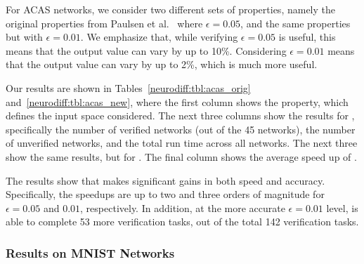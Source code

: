 For ACAS networks, we consider two different sets of properties,
namely the original properties from Paulsen et al.~\cite{PaulsenWW20}
where $ \epsilon = 0.05 $, and the same properties but with $ \epsilon
= 0.01 $.  We emphasize that, while verifying $ \epsilon = 0.05 $ is
useful, this means that the output value can vary by up to
10\%. Considering $ \epsilon = 0.01 $ means that the output value can
vary by up to 2\%, which is much more useful.

Our results are shown in Tables~\ref{neurodiff:tbl:acas_orig}
and~\ref{neurodiff:tbl:acas_new}, where the first column shows the property,
which defines the input space considered. The next three columns show
the results for \Name{}, specifically the number of verified networks
(out of the 45 networks), the number of unverified networks, and the
total run time across all networks. The next three show the same
results, but for \ReluDiffP{}. The final column shows the average
speed up of \Name{}.

The results show that \Name{} makes significant gains in both speed
and accuracy. Specifically, the speedups are up to two and three
orders of magnitude for $ \epsilon = 0.05 $ and $ 0.01 $,
respectively. In addition, at the more accurate $ \epsilon = 0.01 $
level, \Name{} is able to complete 53 more verification tasks, out of
the total 142 verification tasks.


\subsubsection{Results on MNIST Networks}


